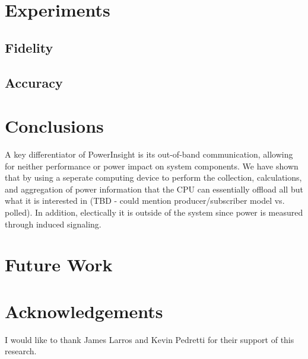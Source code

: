 \documentclass{article}
\begin{document}
\section{Experiments}
\subsection{Fidelity}
\subsection{Accuracy}
\section{Conclusions}
A key differentiator of PowerInsight is its out-of-band communication,
allowing for neither performance or power impact on system components.
We have shown that by using a seperate computing device to perform the
collection, calculations, and aggregation of power information that the
CPU can essentially offload all but what it is interested in (TBD -
could mention producer/subscriber model vs. polled).  In addition,
electically it is outside of the system since power is measured through
induced signaling.
\section{Future Work}
\section{Acknowledgements}
I would like to thank James Larros and Kevin Pedretti for their
support of this research.


\end{document}
